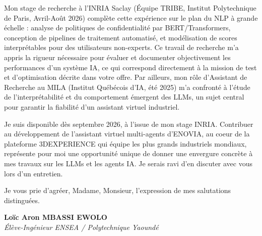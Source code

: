 \documentclass[a4paper,11pt]{article}
\begin{document}
Mon stage de recherche à l'INRIA Saclay (Équipe TRIBE, Institut Polytechnique de Paris, Avril-Août 2026) complète cette expérience sur le plan du NLP à grande échelle : analyse de politiques de confidentialité par BERT/Transformers, conception de pipelines de traitement automatisé, et modélisation de scores interprétables pour des utilisateurs non-experts. Ce travail de recherche m'a appris la rigueur nécessaire pour évaluer et documenter objectivement les performances d'un système IA, ce qui correspond directement à la mission de test et d'optimisation décrite dans votre offre. Par ailleurs, mon rôle d'Assistant de Recherche au MILA (Institut Québécois d'IA, été 2025) m'a confronté à l'étude de l'interprétabilité et du comportement émergent des LLMs, un sujet central pour garantir la fiabilité d'un assistant virtuel industriel.

Je suis disponible dès septembre 2026, à l'issue de mon stage INRIA. Contribuer au développement de l'assistant virtuel multi-agents d'ENOVIA, au coeur de la plateforme 3DEXPERIENCE qui équipe les plus grands industriels mondiaux, représente pour moi une opportunité unique de donner une envergure concrète à mes travaux sur les LLMs et les agents IA. Je serais ravi d'en discuter avec vous lors d'un entretien.

Je vous prie d'agréer, Madame, Monsieur, l'expression de mes salutations distinguées.

\vspace{0.8cm}

\textbf{Loïc Aron MBASSI EWOLO}\\
\textit{Élève-Ingénieur ENSEA / Polytechnique Yaoundé}
\end{document}
